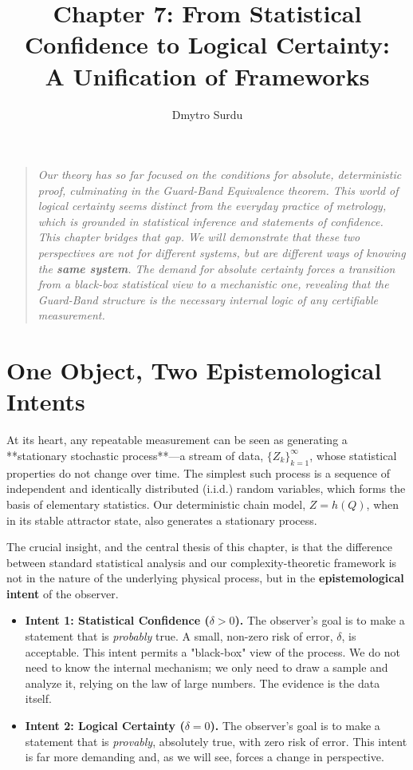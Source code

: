 \documentclass[12pt]{article}
\title{\textbf{Chapter 7: From Statistical Confidence to Logical Certainty: \\ A Unification of Frameworks}}
\author{Dmytro Surdu}
\date{}
\theoremstyle{definition}
\theoremstyle{plain}
\begin{document}
\maketitle

\begin{quote}
\textit{Our theory has so far focused on the conditions for absolute, deterministic proof, culminating in the Guard-Band Equivalence theorem. This world of logical certainty seems distinct from the everyday practice of metrology, which is grounded in statistical inference and statements of confidence. This chapter bridges that gap. We will demonstrate that these two perspectives are not for different systems, but are different ways of knowing the \textbf{same system}. The demand for absolute certainty forces a transition from a black-box statistical view to a mechanistic one, revealing that the Guard-Band structure is the necessary internal logic of any certifiable measurement.}
\end{quote}

\section{One Object, Two Epistemological Intents}

At its heart, any repeatable measurement can be seen as generating a **stationary stochastic process**---a stream of data, $\{Z_k\}_{k=1}^\infty$, whose statistical properties do not change over time. The simplest such process is a sequence of independent and identically distributed (i.i.d.) random variables, which forms the basis of elementary statistics. Our deterministic chain model, $Z = h(Q)$, when in its stable attractor state, also generates a stationary process.

The crucial insight, and the central thesis of this chapter, is that the difference between standard statistical analysis and our complexity-theoretic framework is not in the nature of the underlying physical process, but in the \textbf{epistemological intent} of the observer.

\begin{itemize}
    \item \textbf{Intent 1: Statistical Confidence ($\delta > 0$).} The observer's goal is to make a statement that is \emph{probably} true. A small, non-zero risk of error, $\delta$, is acceptable. This intent permits a "black-box" view of the process. We do not need to know the internal mechanism; we only need to draw a sample and analyze it, relying on the law of large numbers. The evidence is the data itself.

    \item \textbf{Intent 2: Logical Certainty ($\delta = 0$).} The observer's goal is to make a statement that is \emph{provably}, absolutely true, with zero risk of error. This intent is far more demanding and, as we will see, forces a change in perspective.
\end{itemize}
\end{document}
